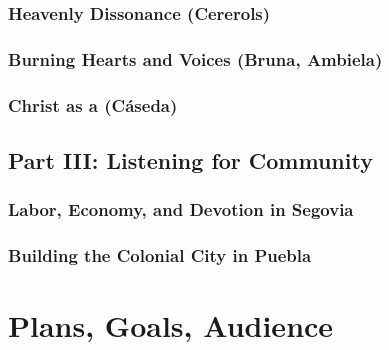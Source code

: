 \documentclass{vcbook-proposal}
\begin{document}
\subsubsection{Heavenly Dissonance (Cererols)}

\subsubsection{Burning Hearts and Voices (Bruna, Ambiela)}

\subsubsection{Christ as a  (Cáseda)}


\subsection{Part III: Listening for Community}

\subsubsection{Labor, Economy, and Devotion in Segovia}

\subsubsection{Building the Colonial City in Puebla}

\section{Plans, Goals, Audience}


\printbibliography
\end{document}
